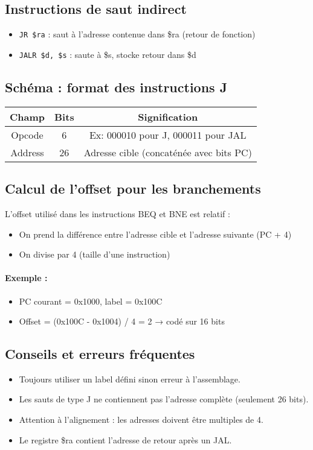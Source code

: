 \documentclass[12pt,a4paper]{article}
\begin{document}
\subsection{Instructions de saut indirect}
\begin{itemize}
  \item \texttt{JR \$ra} : saut à l’adresse contenue dans \$ra (retour de fonction)
  \item \texttt{JALR \$d, \$s} : saute à \$s, stocke retour dans \$d
\end{itemize}

\subsection{Schéma : format des instructions J}
\begin{center}
\begin{tabular}{|c|c|c|}
\hline
\textbf{Champ} & \textbf{Bits} & \textbf{Signification} \\
\hline
Opcode & 6 & Ex: 000010 pour J, 000011 pour JAL \\
Address & 26 & Adresse cible (concaténée avec bits PC) \\
\hline
\end{tabular}
\end{center}

\subsection{Calcul de l’offset pour les branchements}
L’offset utilisé dans les instructions BEQ et BNE est relatif :
\begin{itemize}
  \item On prend la différence entre l’adresse cible et l’adresse suivante (PC + 4)
  \item On divise par 4 (taille d’une instruction)
\end{itemize}

\paragraph{Exemple :}
\begin{itemize}
  \item PC courant = 0x1000, label = 0x100C
  \item Offset = (0x100C - 0x1004) / 4 = 2 → codé sur 16 bits
\end{itemize}

\subsection{Conseils et erreurs fréquentes}
\begin{itemize}
  \item Toujours utiliser un label défini sinon erreur à l’assemblage.
  \item Les sauts de type J ne contiennent pas l’adresse complète (seulement 26 bits).
  \item Attention à l’alignement : les adresses doivent être multiples de 4.
  \item Le registre \$ra contient l’adresse de retour après un JAL.
\end{itemize}
\end{document}
